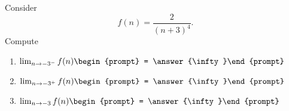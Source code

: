 \documentclass{ximera}
\author{Bart Snapp}
\begin{document}
\begin{exercise}
Consider 
\[
f(n) = \frac{2}{(n+3)^4}.
\]
Compute
\begin{enumerate}
\item $\lim_{n\to -3^- } f(n) \begin{prompt} = \answer{\infty}\end{prompt}$
\item $\lim_{n\to -3^+ } f(n) \begin{prompt} = \answer{\infty}\end{prompt}$
\item $\lim_{n\to -3 } f(n) \begin{prompt} = \answer{\infty}\end{prompt}$
\end{enumerate}
\end{exercise}
\end{document}
